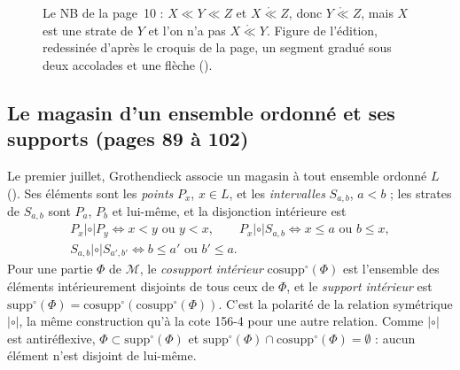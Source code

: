 \begin{figure}[ht]
\centering
{}
\caption{Le NB de la page~10 : $X \ll Y \ll Z$ et $X \mathrel{\mathring\ll} Z$, donc $Y \mathrel{\mathring\ll} Z$, mais $X$ est une strate de $Y$ et l'on n'a pas $X \mathrel{\mathring\ll} Y$. Figure de l'édition, redessinée d'après le croquis de la page, un segment gradué sous deux accolades et une flèche ().}
\label{fig:156-8-nb}
\end{figure}

\subsection*{Le magasin d'un ensemble ordonné et ses supports (pages 89 à 102)}

Le premier juillet, Grothendieck associe un magasin à tout ensemble ordonné $L$ (). Ses éléments sont les \emph{points} $P_x$, $x \in L$, et les \emph{intervalles} $S_{a,b}$, $a < b$ ; les strates de $S_{a,b}$ sont $P_a$, $P_b$ et lui-même, et la disjonction intérieure est
\begin{gather*}
P_x \mathrel{|\circ|} P_y \iff x < y \text{ ou } y < x, \qquad
P_x \mathrel{|\circ|} S_{a,b} \iff x \leq a \text{ ou } b \leq x, \\
S_{a,b} \mathrel{|\circ|} S_{a',b'} \iff b \leq a' \text{ ou } b' \leq a .
\end{gather*}
Pour une partie $\Phi$ de $\mathcal M$, le \emph{cosupport intérieur} $\mathrm{cosupp}^\circ(\Phi)$ est l'ensemble des éléments intérieurement disjoints de tous ceux de $\Phi$, et le \emph{support intérieur} est $\mathrm{supp}^\circ(\Phi) = \mathrm{cosupp}^\circ(\mathrm{cosupp}^\circ(\Phi))$. C'est la polarité de la relation symétrique $\mathrel{|\circ|}$, la même construction qu'à la cote 156-4 pour une autre relation. Comme $\mathrel{|\circ|}$ est antiréflexive, $\Phi \subset \mathrm{supp}^\circ(\Phi)$ et $\mathrm{supp}^\circ(\Phi) \cap \mathrm{cosupp}^\circ(\Phi) = \emptyset$ : aucun élément n'est disjoint de lui-même.

